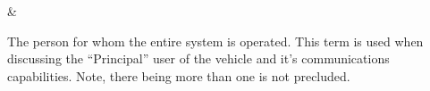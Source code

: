 
\VIP      & \begin{minipage}{\GlossaryColumnWidth}{%
The person for whom the entire system is operated. 
This term is used when discussing the ``Principal'' user of the vehicle and it's communications capabilities.
Note, there being more than one \VIP is not precluded.
}\end{minipage}\\ \hline%